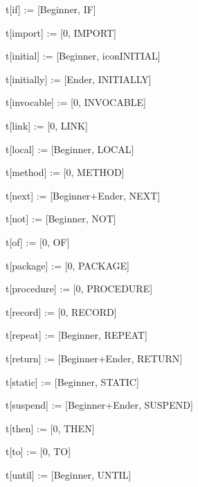 {\ttfamily\mdseries
\ \ \ t[{\textquotedbl}if{\textquotedbl}] := [Beginner, IF]}

{\ttfamily\mdseries
\ \ \ t[{\textquotedbl}import{\textquotedbl}] := [0, IMPORT]}

{\ttfamily\mdseries
\ \ \ t[{\textquotedbl}initial{\textquotedbl}] := [Beginner, iconINITIAL]}

{\ttfamily\mdseries
\ \ \ t[{\textquotedbl}initially{\textquotedbl}] := [Ender, INITIALLY]}

{\ttfamily\mdseries
\ \ \ t[{\textquotedbl}invocable{\textquotedbl}] := [0, INVOCABLE]}

{\ttfamily\mdseries
\ \ \ t[{\textquotedbl}link{\textquotedbl}] := [0, LINK]}

{\ttfamily\mdseries
\ \ \ t[{\textquotedbl}local{\textquotedbl}] := [Beginner, LOCAL]}

{\ttfamily\mdseries
\ \ \ t[{\textquotedbl}method{\textquotedbl}] := [0, METHOD]}

{\ttfamily\mdseries
\ \ \ t[{\textquotedbl}next{\textquotedbl}] := [Beginner+Ender, NEXT]}

{\ttfamily\mdseries
\ \ \ t[{\textquotedbl}not{\textquotedbl}] := [Beginner, NOT]}

{\ttfamily\mdseries
\ \ \ t[{\textquotedbl}of{\textquotedbl}] := [0, OF]}

{\ttfamily\mdseries
\ \ \ t[{\textquotedbl}package{\textquotedbl}] := [0, PACKAGE]}

{\ttfamily\mdseries
\ \ \ t[{\textquotedbl}procedure{\textquotedbl}] := [0, PROCEDURE]}

{\ttfamily\mdseries
\ \ \ t[{\textquotedbl}record{\textquotedbl}] := [0, RECORD]}

{\ttfamily\mdseries
\ \ \ t[{\textquotedbl}repeat{\textquotedbl}] := [Beginner, REPEAT]}

{\ttfamily\mdseries
\ \ \ t[{\textquotedbl}return{\textquotedbl}] := [Beginner+Ender, RETURN]}

{\ttfamily\mdseries
\ \ \ t[{\textquotedbl}static{\textquotedbl}] := [Beginner, STATIC]}

{\ttfamily\mdseries
\ \ \ t[{\textquotedbl}suspend{\textquotedbl}] := [Beginner+Ender, SUSPEND]}

{\ttfamily\mdseries
\ \ \ t[{\textquotedbl}then{\textquotedbl}] := [0, THEN]}

{\ttfamily\mdseries
\ \ \ t[{\textquotedbl}to{\textquotedbl}] := [0, TO]}

{\ttfamily\mdseries
\ \ \ t[{\textquotedbl}until{\textquotedbl}] := [Beginner, UNTIL]}

